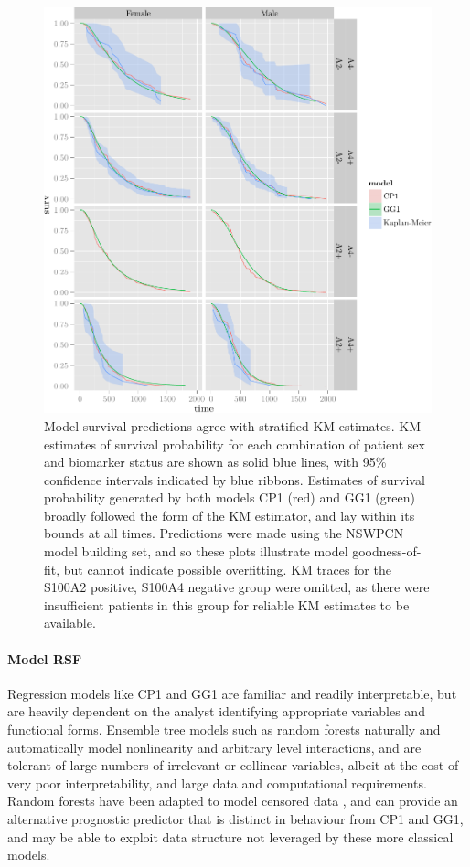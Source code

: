 \documentclass[dissertation.tex]{subfiles}
\begin{document}
\begin{figure}
\centering
  \includegraphics[width=.7\linewidth]{analysis/nomogram/figure/05-final-fit-assessment-4-2}
  \caption[Model survival predictions agree with stratified \acrshort{KM} estimates]{Model survival predictions agree with stratified \gls{KM} estimates.  \gls{KM} estimates of survival probability for each combination of patient sex and biomarker status are shown as solid blue lines, with 95\% confidence intervals indicated by blue ribbons.  Estimates of survival probability generated by both models CP1 (red) and GG1 (green) broadly followed the form of the \gls{KM} estimator, and lay within its bounds at all times.  Predictions were made using the \gls{NSWPCN} model building set, and so these plots illustrate model goodness-of-fit, but cannot indicate possible overfitting.  \gls{KM} traces for the S100A2 positive, S100A4 negative group were omitted, as there were insufficient patients in this group for reliable \gls{KM} estimates to be available.}
\label{fig:nomo-cp1-gg1-fitplot}
\end{figure}

\paragraph{Model RSF}
Regression models like CP1 and GG1 are familiar and readily interpretable, but are heavily dependent on the analyst identifying appropriate variables and functional forms.  Ensemble tree models such as random forests \cite{Breiman2001} naturally and automatically model nonlinearity and arbitrary level interactions, and are tolerant of large numbers of irrelevant or collinear variables, albeit at the cost of very poor interpretability, and large data and computational requirements.  Random forests have been adapted to model censored data \cite{Ishwaran2008}, and can provide an alternative prognostic predictor that is distinct in behaviour from CP1 and GG1, and may be able to exploit data structure not leveraged by these more classical models.
\end{document}
